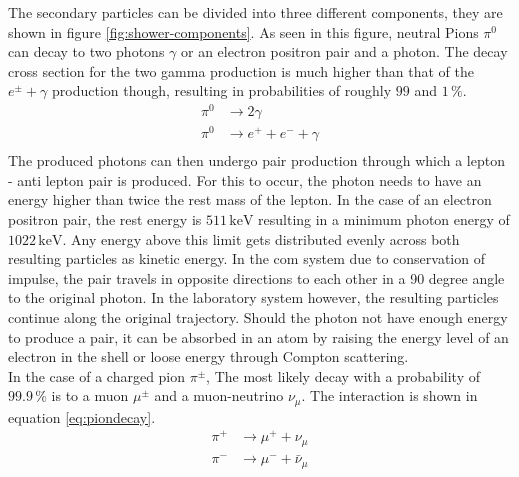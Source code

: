\documentclass[abstract,toc,los,lof,english,10pt,glossary,acronyms,lotl]{jluthesis}
\begin{document}
The secondary particles can be divided into three different components, they are shown in figure \ref{fig:shower-components}.
As seen in this figure, neutral Pions $\pi^0$ can decay to two photons $\gamma$ or an electron positron pair and a photon. The decay cross section for the two gamma production is much higher than that of the $e^\pm + \gamma$ production though, resulting in probabilities of roughly $99$ and $1\,\%$. 
\begin{equation}
	\begin{aligned}
		\pi^0 &\rightarrow 2\gamma \\
		\pi^0 &\rightarrow e^+ + e^- + \gamma \\
	\end{aligned}
\end{equation}
The produced photons can then undergo pair production through which a lepton - anti lepton pair is produced. For this to occur, the photon needs to have an energy higher than twice the rest mass of the lepton. In the case of an electron positron pair, the rest energy is $511\,\text{keV}$ resulting in a minimum photon energy of $1022\,\text{keV}$. Any energy above this limit gets distributed evenly across both resulting particles as kinetic energy. In the \acrfull{com} system due to conservation of impulse, the pair travels in opposite directions to each other in a 90 degree angle to the original photon. In the laboratory system however, the resulting particles continue along the original trajectory.
Should the photon not have enough energy to produce a pair, it can be absorbed in an atom by raising the energy level of an electron in the shell or loose energy through Compton scattering.\\
In the case of a charged pion $\pi^\pm$, The most likely decay with a probability of $99.9\,\%$ is to a muon $\mu^\pm$ and a muon-neutrino $\nu_\mu$. The interaction is shown in equation \ref{eq:piondecay}.
\begin{equation}\label{eq:piondecay}
	\begin{aligned}
		\pi^+ &\rightarrow \mu^+ + \nu_\mu \\
		\pi^- &\rightarrow \mu^- + \bar{\nu}_\mu
	\end{aligned}
\end{equation}
\end{document}
